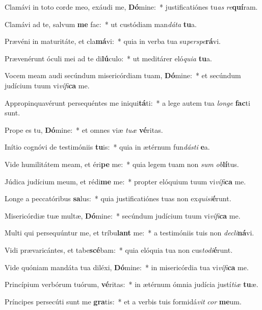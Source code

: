 \item Clamávi in toto corde meo, exáudi me, \textbf{Dó}mine:~* justificatiónes tu\textit{as} \textit{re}\textbf{quí}ram.
\item Clamávi ad te, salvum \textbf{me} fac:~* ut custódiam man\textit{dá}\textit{ta} \textbf{tu}a.
\item Prævéni in maturitáte, et cla\textbf{má}vi:~* quia in verba tua su\textit{per}\textit{spe}\textbf{rá}vi.
\item Prævenérunt óculi mei ad te di\textbf{lú}culo:~* ut meditárer eló\textit{qui}\textit{a} \textbf{tu}a.
\item Vocem meam audi secúndum misericórdiam tuam, \textbf{Dó}mine:~* et secúndum judícium tuum vi\textit{ví}\textit{fi}\textbf{ca} me.
\item Appropinquavérunt persequéntes me iniqui\textbf{tá}ti:~* a lege autem tua \textit{lon}\textit{ge} \textbf{fac}ti sunt.
\item Prope es tu, \textbf{Dó}mine:~* et omnes viæ \textit{tu}\textit{æ} \textbf{vé}ritas.
\item Inítio cognóvi de testimóniis \textbf{tu}is:~* quia in ætérnum fun\textit{dás}\textit{ti} \textbf{e}a.
\item Vide humilitátem meam, et éri\textbf{pe} me:~* quia legem tuam non \textit{sum} \textit{ob}\textbf{lí}tus.
\item Júdica judícium meum, et rédi\textbf{me} me:~* propter elóquium tuum vi\textit{ví}\textit{fi}\textbf{ca} me.
\item Longe a peccatóribus \textbf{sa}lus:~* quia justificatiónes tuas non ex\textit{qui}\textit{si}\textbf{é}runt.
\item Misericórdiæ tuæ multæ, \textbf{Dó}mine:~* secúndum judícium tuum vi\textit{ví}\textit{fi}\textbf{ca} me.
\item Multi qui persequúntur me, et tríbu\textbf{lant} me:~* a testimóniis tuis non \textit{de}\textit{cli}\textbf{ná}vi.
\item Vidi prævaricántes, et tabe\textbf{scé}bam:~* quia elóquia tua non cus\textit{to}\textit{di}\textbf{é}runt.
\item Vide quóniam mandáta tua diléxi, \textbf{Dó}mine:~* in misericórdia tua vi\textit{ví}\textit{fi}\textbf{ca} me.
\item Princípium verbórum tuórum, \textbf{vé}ritas:~* in ætérnum ómnia judícia justí\textit{ti}\textit{æ} \textbf{tu}æ.
\item Príncipes persecúti sunt me \textbf{gra}tis:~* et a verbis tuis formidá\textit{vit} \textit{cor} \textbf{me}um.
